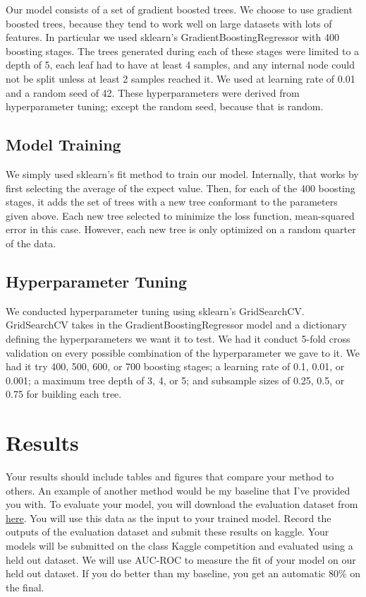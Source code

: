 \documentclass{article}
\begin{document}
Our model consists of a set of gradient boosted trees. We choose to use gradient boosted trees, because they tend to work well on large datasets with lots of features. In particular we used sklearn's GradientBoostingRegressor with 400 boosting stages. The trees generated during each of these stages were limited to a depth of 5, each leaf had to have at least 4 samples, and any internal node could not be split unless at least 2 samples reached it. We used at learning rate of 0.01 and a random seed of 42. These hyperparameters were derived from hyperparameter tuning; except the random seed, because that is random. 

\subsection{Model Training}

We simply used sklearn's fit method to train our model. Internally, that works by first selecting the average of the expect value. Then, for each of the 400 boosting stages, it adds the set of trees with a new tree conformant to the parameters given above. Each new tree selected to minimize the loss function, mean-squared error in this case. However, each new tree is only optimized on a random quarter of the data. 

\subsection{Hyperparameter Tuning}

We conducted hyperparameter tuning using sklearn's GridSearchCV. GridSearchCV takes in the GradientBoostingRegressor model and a dictionary defining the hyperparameters we want it to test. We had it conduct 5-fold cross validation on every possible combination of the hyperparameter we gave to it. We had it try 400, 500, 600, or 700 boosting stages; a learning rate of 0.1, 0.01, or 0.001; a maximum tree depth of 3, 4, or 5; and subsample sizes of 0.25, 0.5, or 0.75 for building each tree. 

\section{Results}

Your results should include tables and figures that compare your method to others. An example of another method would be my baseline that I've provided you with. To evaluate your model, you will download the evaluation dataset from \href{https://www.kaggle.com/competitions/csce-421-machine-learning-spring-2023-section-501/data}{here}. You will use this data as the input to your trained model. Record the outputs of the evaluation dataset and submit these results on kaggle. Your models will be submitted on the class Kaggle competition and evaluated using a held out dataset. We will use AUC-ROC to measure the fit of your model on our held out dataset. If you do better than my baseline, you get an automatic 80$\%$ on the final.
\end{document}
